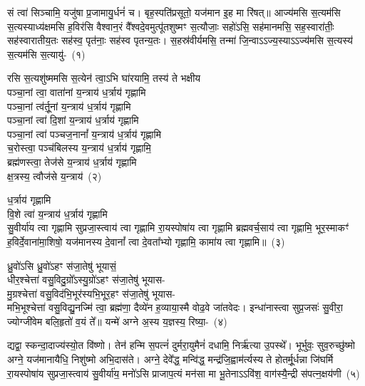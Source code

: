 \setcounter{anuvakam}{0}
सं त्वा॑ सिञ्चामि॒ यजु॑षा प्र॒जामायु॒र्धनं॑ च। बृह॒स्पति॑प्रसूतो॒ यज॑मान इ॒ह मा रि॑षत्॥ आज्य॑मसि स॒त्यम॑सि स॒त्यस्याध्य॑क्षमसि ह॒विर॑सि वैश्वान॒रं वै᳚श्वदे॒वमुत्पू॑तशुष्मꣳ स॒त्यौजाः॒ सहो॑\-ऽसि॒ सह॑मानमसि॒ सह॒स्वारा॑तीः॒ सह॑स्वारातीय॒तः सह॑स्व॒ पृत॑नाः॒ सह॑स्व पृतन्य॒तः। स॒हस्र॑वीर्यमसि॒ तन्मा॑ जि॒न्वा\-ऽऽ\-ज्य॒स्या\-ऽऽ\-ज्य॑मसि स॒त्यस्य॑ स॒त्यम॑सि स॒त्यायु॑-~(१)\ip

रसि स॒त्यशु॑ष्ममसि स॒त्येन॑ त्वा॒\-ऽभि घा॑रयामि॒ तस्य॑ ते भक्षीय\\
पञ्चा॒नां त्वा॒ वाता॑नां य॒न्त्राय॑ ध॒र्त्राय॑ गृह्णामि\\
पञ्चा॒नां त्व॑र्तू॒नां य॒न्त्राय॑ ध॒र्त्राय॑ गृह्णामि\\
पञ्चा॒नां त्वा॑ दि॒शां य॒न्त्राय॑ ध॒र्त्राय॑ गृह्णामि\\
पञ्चा॒नां त्वा॑ पञ्चज॒नानां᳚ य॒न्त्राय॑ ध॒र्त्राय॑ गृह्णामि\\
च॒रोस्त्वा॒ पञ्च॑बिलस्य य॒न्त्राय॑ ध॒र्त्राय॑ गृह्णामि॒\\
ब्रह्म॑णस्त्वा॒ तेज॑से य॒न्त्राय॑ ध॒र्त्राय॑ गृह्णामि\\
क्ष॒त्रस्य॒ त्वौज॑से य॒न्त्राय॑~(२)\ip

ध॒र्त्राय॑ गृह्णामि\\
वि॒शे त्वा॑ य॒न्त्राय॑ ध॒र्त्राय॑ गृह्णामि\\
सु॒वीर्या॑य त्वा गृह्णामि सुप्रजा॒स्त्वाय॑ त्वा गृह्णामि रा॒यस्पोषा॑य त्वा गृह्णामि ब्रह्मवर्च॒साय॑ त्वा गृह्णामि॒ भूर॒स्माकꣳ॑ ह॒विर्दे॒वाना॑मा॒शिषो॒ यज॑मानस्य दे॒वानां᳚ त्वा दे॒वता᳚भ्यो गृह्णामि॒ कामा॑य त्वा गृह्णामि॥~(३)\ip

{\anuvakamend[{स॒त्यायु॒रोज॑से य॒न्त्राय॒ त्रय॑स्त्रिꣳशच्च}]}

ध्रु॒वो॑\-ऽसि ध्रु॒वो॑\-ऽहꣳ स॑जा॒तेषु॑ भूयासं॒\\
धीर॒श्चेत्ता॑ वसु॒विदु॒ग्रो᳚\-ऽस्यु॒ग्रो॑\-ऽहꣳ स॑जा॒तेषु॑ भूयास-\\
मु॒ग्रश्चेत्ता॑ वसु॒विद॑भि॒भूर॑स्यभि॒भूर॒हꣳ स॑जा॒तेषु॑ भूयास-\\
मभि॒भूश्चेत्ता॑ वसु॒विद्यु॒नज्मि॑ त्वा॒ ब्रह्म॑णा॒ दैव्ये॑न ह॒व्याया॒स्मै वोढ॒वे जा॑तवेदः। इन्धा॑नास्त्वा सुप्र॒जसः॑ सु॒वीरा॒ ज्योग्जी॑वेम बलि॒हृतो॑ व॒यं ते᳚॥ यन्मे॑ अग्ने अ॒स्य य॒ज्ञस्य॒ रिष्या॒-~(४)\ip

द्यद्वा॒ स्कन्दा॒दाज्य॑स्यो॒त वि॑ष्णो। तेन॑ हन्मि स॒पत्नं॑ दुर्मरा॒युमैनं॑ दधामि॒ निर्\mbox{}ऋ॑त्या उ॒पस्थे᳚। भूर्भुवः॒ सुव॒रुच्छु॑ष्मो अग्ने॒ यज॑मानायैधि॒ निशु॑ष्मो अभि॒दास॑ते। अग्ने॒ देवे᳚द्ध॒ मन्वि॑द्ध॒ मन्द्र॑जि॒ह्वाम॑र्त्यस्य ते होतर्मू॒र्धन्ना जि॑घर्मि रा॒यस्पोषा॑य सुप्रजा॒स्त्वाय॑ सु॒वीर्या॑य॒ मनो॑\-ऽसि प्राजाप॒त्यं मन॑सा मा भू॒तेना\-ऽऽ\-वि॑श॒ वाग॑स्यै॒न्द्री स॑पत्न॒क्षय॑णी~(५)\ip


